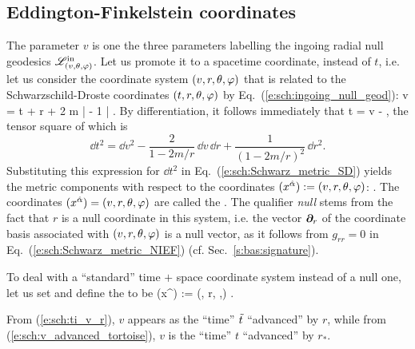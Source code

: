 \subsection{Eddington-Finkelstein coordinates} \label{s:sch:EF_coord}

The parameter $v$ is one the three parameters labelling the
ingoing radial null geodesics $\mathscr{L}^{\rm in}_{(v,\theta,\varphi)}$.
Let us promote it to a spacetime coordinate, instead of $t$, i.e. let us
consider the coordinate system $(v,r,\theta,\varphi)$ that is related to the
Schwarzschild-Droste coordinates $(t,r,\theta,\varphi)$ by Eq.~(\ref{e:sch:ingoing_null_geod}):
\be \label{e:sch:v_t_r}
     v = t + r + 2 m \ln \left|  - 1 \right| .
\ee
By differentiation, it follows immediately that
\be \label{e:sch:dt_dv_NIEF}
    \dd t = \dd v -   ,
\ee
the tensor square of which is
\[
    \dd t^2 = \dd v^2 - \frac{2}{1 - 2m/r} \, \dd v \, \dd r + \frac{1}{(1 - 2m/r)^2}\, \dd r^2 .
\]
Substituting this expression for $\dd t^2$ in Eq.~(\ref{e:sch:Schwarz_metric_SD})
yields the metric components with respect to the coordinates
$(x^{\hat{\alpha}}) := (v,r,\theta,\varphi)$:
\be \label{e:sch:Schwarz_metric_NIEF}
    .
\ee
The coordinates $(x^{\hat{\alpha}}) = (v,r,\theta,\varphi)$ are called the
. The qualifier \emph{null} stems from the fact that
$r$ is a null coordinate in this system, i.e. the vector $\bm{\partial}_r$ of the coordinate
basis associated with $(v,r,\theta,\varphi)$ is a null
vector, as it follows from $g_{rr}=0$ in Eq.~(\ref{e:sch:Schwarz_metric_NIEF})
(cf. Sec.~\ref{s:bas:signature}).

To deal with a ``standard'' time $+$ space coordinate system instead of a null one, let us set
\be  \label{e:sch:ti_v_r}
     \iff {}
\ee
and define the 
to be
\be
    (x^{\tilde{\alpha}}) := (\ti, r, \th,\ph) .
\ee

\begin{remark}
From (\ref{e:sch:ti_v_r}), $v$ appears as the ``time'' ${\tilde t}$ ``advanced'' by
$r$, while
from (\ref{e:sch:v_advanced_tortoise}), $v$ is the ``time'' $t$ ``advanced''
by $r_*$.
\end{remark}

